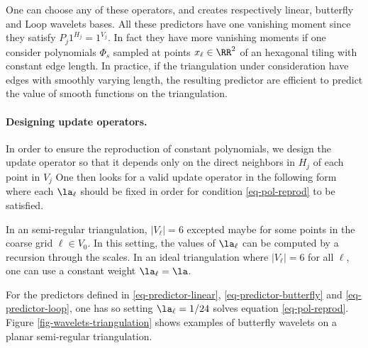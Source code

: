 
One can choose any of these operators, and creates respectively linear, butterfly and Loop wavelets bases. All these predictors have one vanishing moment since they satisfy $P_j 1^{H_j} = 1^{V_j}$. In fact they have more vanishing moments if one consider polynomials $\Phi_s$ sampled at points $x_\ell \in \RR^2$ of an hexagonal tiling with constant edge length. In practice, if the triangulation under consideration have edges with smoothly varying length, the resulting predictor are efficient to predict the value of smooth functions on the triangulation.

\paragraph{Designing update operators.}

In order to ensure the reproduction of constant polynomials, we design the update operator so that it depends only on the direct neighbors in $H_j$ of each point in $V_j$
One then looks for a valid update operator in the following form
where each $\la_\ell$ should be fixed in order for condition \eqref{eq-pol-reprod} to be satisfied. 

In an semi-regular triangulation, $|V_\ell|=6$ excepted maybe for some points in the coarse grid $\ell \in V_0$. In this setting, the values of $\la_\ell$ can be computed by a recursion through the scales. In an ideal triangulation where $|V_\ell|=6$ for all $\ell$, one can use a constant weight $\la_\ell = \la$. 

For the predictors defined in \eqref{eq-predictor-linear}, \eqref{eq-predictor-butterfly} and \eqref{eq-predictor-loop}, one has
so setting $\la_\ell = 1/24$ solves equation \eqref{eq-pol-reprod}. Figure \ref{fig-wavelets-triangulation} shows examples of butterfly wavelets on a planar semi-regular triangulation.




